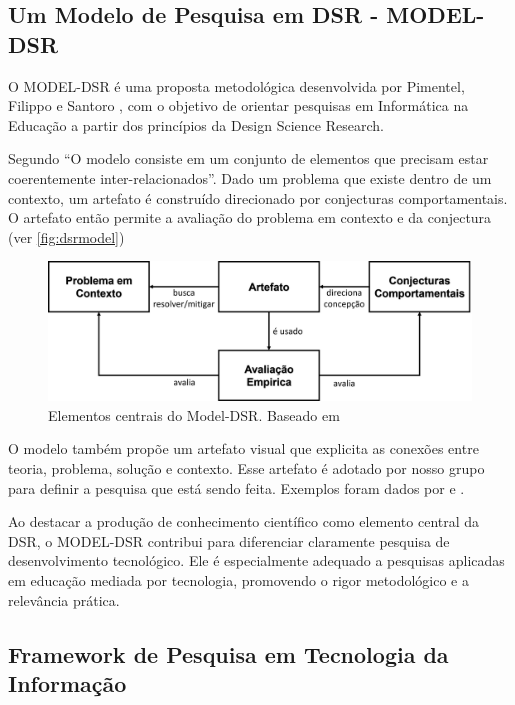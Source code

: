 \subsection{Um Modelo de Pesquisa em DSR - MODEL-DSR}

O MODEL-DSR é uma proposta metodológica desenvolvida por Pimentel, Filippo e Santoro \cite{pimentel2019dsr,pimentel2023}, com o objetivo de orientar pesquisas em Informática na Educação a partir dos princípios da Design Science Research. 

Segundo \citet{pimentel2023} ``O modelo consiste em um conjunto de elementos que precisam estar coerentemente inter-relacionados''. Dado um problema que existe dentro de um contexto, um artefato é construído direcionado por conjecturas comportamentais. O artefato então permite a avaliação do problema em contexto e da conjectura (ver \autoref{fig:dsrmodel})

\begin{figure}
    \centering
    \includegraphics[width=0.5\linewidth]{Images/dsr pimental.png}
    \caption{Elementos centrais do Model-DSR. Baseado em \citep{pimentel2023}}
    \label{fig:dsrmodel}
\end{figure}

O modelo também propõe um artefato visual que explicita as conexões entre teoria, problema, solução e contexto. Esse artefato é adotado por nosso grupo para definir a pesquisa que está sendo feita. Exemplos foram dados por \citet{pimentel2019dsr} e \citet{pimentel2023}.

Ao destacar a produção de conhecimento científico como elemento central da DSR, o MODEL-DSR contribui para diferenciar claramente pesquisa de desenvolvimento tecnológico. Ele é especialmente adequado a pesquisas aplicadas em educação mediada por tecnologia, promovendo o rigor metodológico e a relevância prática.

\subsection{Framework de Pesquisa em Tecnologia da Informação}

